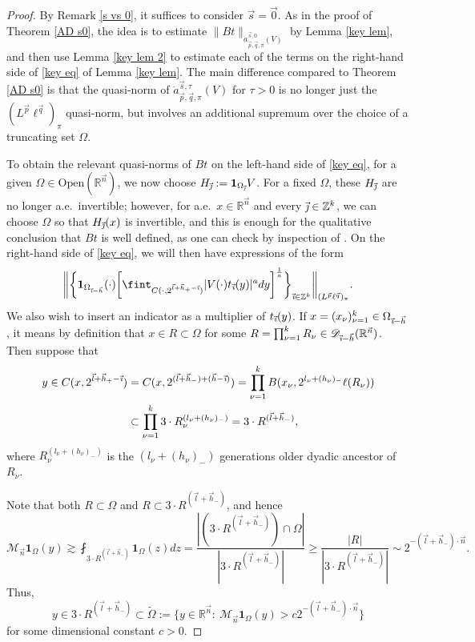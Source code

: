 \documentclass[11pt, reqno]{amsart}
\theoremstyle{definition}
\theoremstyle{remark}
\numberwithin{equation}{section}
\newcommand{\D}{\mathscr D}
\newcommand{\R}{\mathbb R}
\newcommand{\Z}{\mathbb Z}
\newcommand{\vnull}{\vec 0}
\newcommand{\vh}{\vec h}
\newcommand{\vi}{\vec{\textit{\i}}}
\newcommand{\vj}{\vec{\textit{\j}}}
\newcommand{\vn}{\vec n}
\newcommand{\vl}{\vec l}
\newcommand{\vp}{\vec p}
\newcommand{\vq}{\vec q}
\newcommand{\vs}{\vec s}
\newcommand{\atau}{\dot a^{\vs,\tau}_{\vp,\vq,\pi}}
\newcommand{\asn}{\dot a^{\vs,0}_{\vp,\vq,\pi}}
\newcommand{\one}{\mathbf{1}}
\newcommand{\abs}[1]{|#1|}
\newcommand{\Norm}[2]{\|#1\|_{#2}}
\newcommand{\bbNorm}[2]{\bigg\|#1\bigg\|_{#2}}
\newcommand{\Open}{\mathrm{Open}}
\begin{document}
\begin{proof}
By Remark \ref{s vs 0}, it suffices to consider $\vs=\vnull$.
As in the proof of Theorem \ref{AD s0}, the idea is to estimate
$\Norm{Bt}{\asn(V)}$ by Lemma \ref{key lem}, and then use
Lemma \ref{key lem 2} to estimate each of the terms on the right-hand side
of \eqref{key eq} of Lemma \ref{key lem}. The main difference
compared to Theorem \ref{AD s0} is that the quasi-norm of $\atau(V)$
for $\tau>0$ is no longer just the $(L^{\vp}\ell^{\vq})_\pi$ quasi-norm,
but involves an additional supremum over the choice of a truncating set $\Omega$.

To obtain the relevant quasi-norms of $Bt$ on the left-hand side of \eqref{key eq}, for a given $\Omega\in\Open(\R^{\vn})$, we now choose $H_{\vj}:=\one_{\Omega_{\vj}}V$. For a fixed $\Omega$, these $H_{\vj}$ are no longer a.e.\ invertible; however, for a.e.\ $x\in\R^{\vn}$ and every $\vj\in\Z^k$, we can choose $\Omega$ so that $H_{\vj}(x)$ is invertible, and this is enough for the qualitative conclusion that $Bt$ is well defined, as one can check by inspection of \cite[Remark 4.5]{BHYY:1b}. On the right-hand side of \eqref{key eq}, we will then have expressions of the form
\begin{equation}\label{withOmega}
\bbNorm{\bigg\{\one_{\Omega_{\vi-\vh}}(\cdot)\bigg[\fint_{C(\cdot,2^{\vl+\vh_+-\vi})}
\abs{V(\cdot)t_{\vi}(y)}^a dy\bigg]^{\frac1a}\bigg\}_{\vi\in\Z^k}}{
(L^{\vp}\ell^{\vq})_\pi}.
\end{equation}
We also wish to insert an indicator as a multiplier of $t_{\vi}(y)$. If $x=(x_\nu)_{\nu=1}^k\in\Omega_{\vi-\vh}$, it means by definition that $x\in R\subset\Omega$ for some $R=\prod_{\nu=1}^k R_\nu\in\D_{\vi-\vh}(\R^{\vn})$. Then suppose that
\begin{align*}
y\in C(x,2^{\vl+\vh_+-\vi})
&=C(x,2^{(\vl+\vh_-)+(\vh-\vi)})
=\prod_{\nu=1}^k B(x_{\nu},2^{l_\nu+(h_\nu)_-}\ell(R_\nu)) \\
&\subset\prod_{\nu=1}^k 3\cdot R_{\nu}^{(l_\nu+(h_\nu)_-)}
= 3\cdot R^{(\vl+\vh_-)},
\end{align*}
where $R_{\nu}^{(l_\nu+(h_\nu)_-)}$ is the $(l_\nu+(h_\nu)_-)$ generations older dyadic ancestor of $R_{\nu}$.

Note that both $R\subset\Omega$ and $R\subset 3\cdot R^{(\vl+\vh_-)}$, and hence
\begin{equation*}
\mathcal M_{\vn}\one_{\Omega}(y)
\gtrsim \fint_{3\cdot R^{(\vl+\vh_-)}}\one_{\Omega}(z)dz
=\frac{\abs{(3\cdot R^{(\vl+\vh_-)})\cap\Omega} }{ \abs{ 3\cdot R^{(\vl+\vh_-)} } }
\geq \frac{\abs{R}}{  \abs{ 3\cdot R^{(\vl+\vh_-)} } }
\sim 2^{-(\vl+\vh_-)\cdot\vn}.
\end{equation*}
Thus,
\begin{equation*}
y\in 3\cdot R^{(\vl+\vh_-)}
\subset
\widetilde\Omega
:=\{y\in\R^{\vn}:\
\mathcal M_{\vn}\one_{\Omega} (y)> c2^{-(\vl+\vh_-)\cdot\vn}\}
\end{equation*}
for some dimensional constant $c>0$.


\end{proof}
\end{document}
